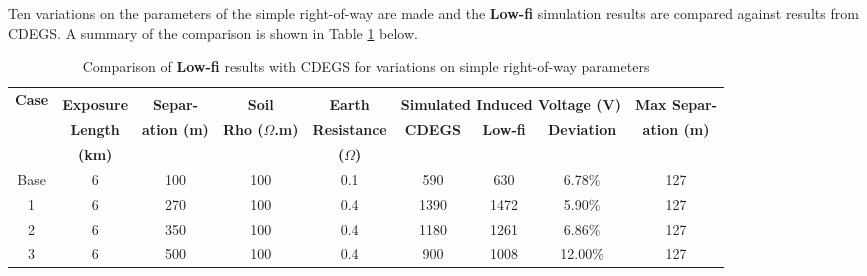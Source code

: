 \documentclass{article}
\begin{document}
Ten variations on the parameters of the simple right-of-way are made and the \textbf{Low-fi} simulation results are compared against results from CDEGS. A summary of the comparison is shown in Table \ref{tab:simple_cdegs} below.

\begin{table}[!htp]
\caption{Comparison of \textbf{Low-fi} results with CDEGS for variations on simple right-of-way parameters}
\label{tab:simple_cdegs}
\begin{tabular}{@{}ccccccccc@{}}
\toprule
\multirow{3}{*}{\textbf{Case}} \\& \textbf{Exposure}  & \textbf{Separ-} & \textbf{Soil} & \textbf{Earth}  & \multicolumn{3}{c}{\textbf{Simulated Induced Voltage (V)}} & \textbf{Max Separ-} \\ \cmidrule(lr){6-8}
& \textbf{Length} & \textbf{ation (m)} & \textbf{Rho ($\Omega$.m)} &  \textbf{Resistance}                                                      & \textbf{CDEGS}   & \textbf{Low-fi}   & \textbf{\parbox{0.1\textwidth}{Deviation}}  &  \textbf{ation (m)}  \\
& \textbf{(km)} &  &  &  \textbf{($\Omega$)} &   &   &   &                                       \\ \midrule
Base                              & 6                                              & 100                                      & 100                                                & 0.1                                                    & 590              & 630               & 6.78\%              & 127                                              \\ \midrule
1                              & 6                                              & 270                                      & 100                                                & 0.4                                                    & 1390             & 1472              & 5.90\%              & 127                                              \\ \midrule
2                              & 6                                              & 350                                      & 100                                                & 0.4                                                    & 1180             & 1261              & 6.86\%              & 127                                              \\ \midrule
3                              & 6                                              & 500                                      & 100                                                & 0.4                                                    & 900              & 1008              & 12.00\%             & 127                                              \\ \midrule

\end{tabular}
\end{table}
\end{document}
